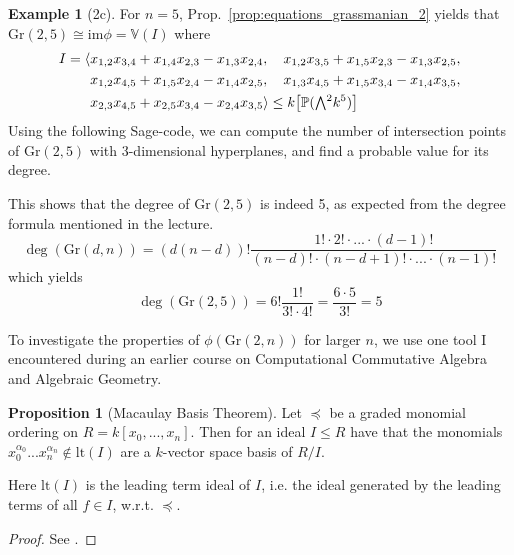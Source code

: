 \documentclass{scrartcl}
\newcommand{\V}{\mathbb{V}}
\newcommand{\Proj}{\mathbb{P}}
\newcommand{\Gr}{\mathrm{Gr}}
\newcommand{\extpow}{\mathchoice{{\textstyle\bigwedge}}
    {{\bigwedge}}
    {{\textstyle\wedge}}
    {{\scriptstyle\wedge}}}
\theoremstyle{definition}
\newtheorem{example}[definition]{Example}
\newtheorem{proposition}[definition]{Proposition}
\begin{document}
\begin{example}[2c]
    For $n = 5$, Prop.~\ref{prop:equations_grassmanian_2} yields that $\Gr(2, 5) \cong \mathrm{im}\phi = \V(I)$ where
    \begin{align*}
        I = \langle &x_{1, 2} x_{3, 4} + x_{1, 4} x_{2, 3} - x_{1, 3} x_{2, 4}, \quad x_{1, 2} x_{3, 5} + x_{1, 5} x_{2, 3} - x_{1, 3} x_{2, 5}, \\
        &x_{1, 2} x_{4, 5} + x_{1, 5} x_{2, 4} - x_{1, 4} x_{2, 5}, \quad x_{1, 3} x_{4, 5} + x_{1, 5} x_{3, 4} - x_{1, 4} x_{3, 5}, \\ 
        &x_{2, 3} x_{4, 5} + x_{2, 5} x_{3, 4} - x_{2, 4} x_{3, 5} \rangle \leq k\bigl[ \Proj(\extpow^2 k^5) \bigr]
    \end{align*}
    Using the following Sage-code, we can compute the number of intersection points of $\Gr(2, 5)$ with 3-dimensional hyperplanes, and find a probable value for its degree.
    
    This shows that the degree of $\Gr(2, 5)$ is indeed 5, as expected from the degree formula mentioned in the lecture.
    \begin{equation*}
        \deg(\Gr(d, n)) = (d(n - d))! \frac {1! \cdot 2! \cdot ... \cdot (d - 1)!} {(n - d)! \cdot (n - d + 1)! \cdot ... \cdot (n - 1)!}
    \end{equation*}
    which yields
    \begin{equation*}
        \deg(\Gr(2, 5)) = 6! \frac {1!} {3! \cdot 4!} = \frac {6 \cdot 5} {3!} = 5
    \end{equation*}
\end{example}
To investigate the properties of $\phi(\Gr(2, n))$ for larger $n$, we use one tool I encountered during an earlier course on Computational Commutative Algebra and Algebraic Geometry.
\begin{proposition}[Macaulay Basis Theorem]
    Let $\preceq$ be a graded monomial ordering on $R = k[x_0, ..., x_n]$.
    Then for an ideal $I \leq R$ have that the monomials $x_0^{\alpha_0} ... x_n^{\alpha_n} \notin \mathrm{lt}(I)$ are a $k$-vector space basis of $R/I$.

    Here $\mathrm{lt}(I)$ is the leading term ideal of $I$, i.e. the ideal generated by the leading terms of all $f \in I$, w.r.t. $\preceq$.
\end{proposition}
\begin{proof}
    See \cite{kreuzer}.
\end{proof}
\end{document}
